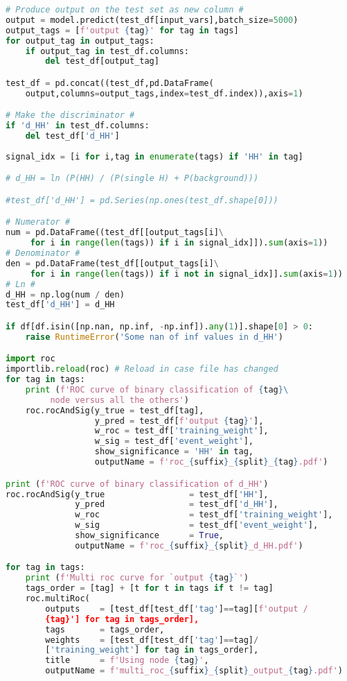\begin{lstlisting}[language=Python, caption=DNN setup for the \wwgg semi-leptonic final state, label={dnncode}]
# Produce output on the test set as new column #
output = model.predict(test_df[input_vars],batch_size=5000)
output_tags = [f'output {tag}' for tag in tags]
for output_tag in output_tags:
    if output_tag in test_df.columns:
        del test_df[output_tag]

test_df = pd.concat((test_df,pd.DataFrame(
    output,columns=output_tags,index=test_df.index)),axis=1)

# Make the discriminator #
if 'd_HH' in test_df.columns:
    del test_df['d_HH']
    
signal_idx = [i for i,tag in enumerate(tags) if 'HH' in tag]

# d_HH = ln (P(HH) / (P(single H) + P(background)))

#test_df['d_HH'] = pd.Series(np.ones(test_df.shape[0]))

# Numerator #
num = pd.DataFrame((test_df[[output_tags[i]\
     for i in range(len(tags)) if i in signal_idx]]).sum(axis=1))
# Denominator #
den = pd.DataFrame(test_df[[output_tags[i]\
     for i in range(len(tags)) if i not in signal_idx]].sum(axis=1))
# Ln #
d_HH = np.log(num / den)
test_df['d_HH'] = d_HH

if df[df.isin([np.nan, np.inf, -np.inf]).any(1)].shape[0] > 0:
    raise RuntimeError('Some nan of inf values in d_HH')

import roc
importlib.reload(roc) # Reload in case file has changed
for tag in tags:
    print (f'ROC curve of binary classification of {tag}\
         node versus all the others')
    roc.rocAndSig(y_true = test_df[tag],
                  y_pred = test_df[f'output {tag}'],
                  w_roc = test_df['training_weight'],
                  w_sig = test_df['event_weight'],
                  show_significance = 'HH' in tag,
                  outputName = f'roc_{suffix}_{split}_{tag}.pdf')

print (f'ROC curve of binary classification of d_HH')
roc.rocAndSig(y_true                 = test_df['HH'],
              y_pred                 = test_df['d_HH'],
              w_roc                  = test_df['training_weight'],
              w_sig                  = test_df['event_weight'],
              show_significance      = True,
              outputName = f'roc_{suffix}_{split}_d_HH.pdf')

for tag in tags:
    print (f'Multi roc curve for `output {tag}`')
    tags_order = [tag] + [t for t in tags if t != tag]
    roc.multiRoc(
        outputs    = [test_df[test_df['tag']==tag][f'output /
        {tag}'] for tag in tags_order],
        tags       = tags_order,
        weights    = [test_df[test_df['tag']==tag]/
        ['training_weight'] for tag in tags_order],
        title      = f'Using node {tag}',
        outputName = f'multi_roc_{suffix}_{split}_output_{tag}.pdf')


\end{lstlisting}
